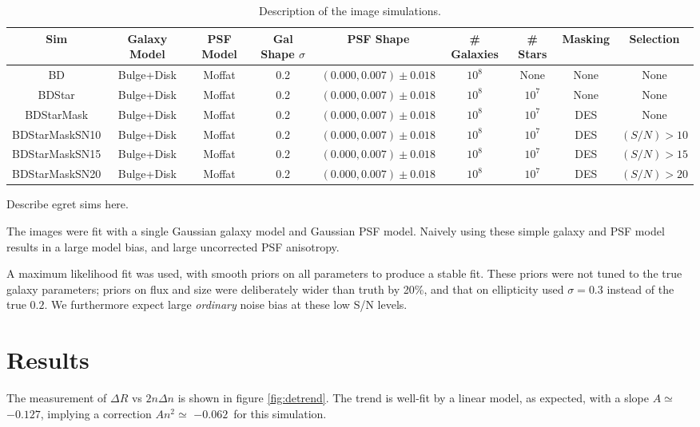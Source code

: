 \documentclass[usegraphicx,usenatbib]{mn2e}
\newcommand{\Aslope}{$-0.127$}
\newcommand{\Rcorr}{$-0.062$}
\newcommand{\nsimNgal}{$10^8$}
\newcommand{\nsimNstar}{$10^7$}
\newcommand{\psfdist}{$(0.000,0.007) \pm 0.018$}
\begin{document}
\begin{table}
    \centering
    \caption{Description of the image simulations. \label{tab:sims}}
    \begin{tabular}{ | c | c | c | c | c | c | c | c | c |}
        Sim        & Galaxy Model & PSF Model & Gal Shape $\sigma$ & PSF Shape  & \# Galaxies & \# Stars    & Masking & Selection  \\
        \hline
        BD         & Bulge+Disk   & Moffat    & 0.2                & \psfdist & \nsimNgal   & None        & None    & None  \\
        BDStar     & Bulge+Disk   & Moffat    & 0.2                & \psfdist & \nsimNgal   & \nsimNstar  & None    & None  \\
        BDStarMask & Bulge+Disk   & Moffat    & 0.2                & \psfdist & \nsimNgal   & \nsimNstar  & DES     & None  \\
        BDStarMaskSN10 & Bulge+Disk   & Moffat    & 0.2            & \psfdist & \nsimNgal   & \nsimNstar  & DES     & $(S/N) > 10$ \\
        BDStarMaskSN15 & Bulge+Disk   & Moffat    & 0.2            & \psfdist & \nsimNgal   & \nsimNstar  & DES     & $(S/N) > 15$ \\
        BDStarMaskSN20 & Bulge+Disk   & Moffat    & 0.2            & \psfdist & \nsimNgal   & \nsimNstar  & DES     & $(S/N) > 20$ \\
    \end{tabular}
\end{table}

Describe egret sims here.

The images were fit with a single Gaussian galaxy model and Gaussian PSF model.
Naively using these simple galaxy and PSF model results in a large model bias,
and large uncorrected PSF anisotropy.

A maximum likelihood fit was used, with smooth priors on all parameters to
produce a stable fit.  These priors were not tuned to the true galaxy
parameters; priors on flux and size were deliberately wider than truth by 20\%,
and that on ellipticity used $\sigma=0.3$ instead of the true $0.2$.  We
furthermore expect large {\em ordinary} noise bias at these low S/N levels.

\section{Results} \label{sec:detrendsim}


The measurement of $\Delta R$ vs $2 n \Delta n$ is shown in figure
\ref{fig:detrend}.  The trend is well-fit by a linear model, as expected, with
a slope $A \simeq $\Aslope, implying a correction $A n^2 \simeq$ \Rcorr\ for this
simulation.
\end{document}
